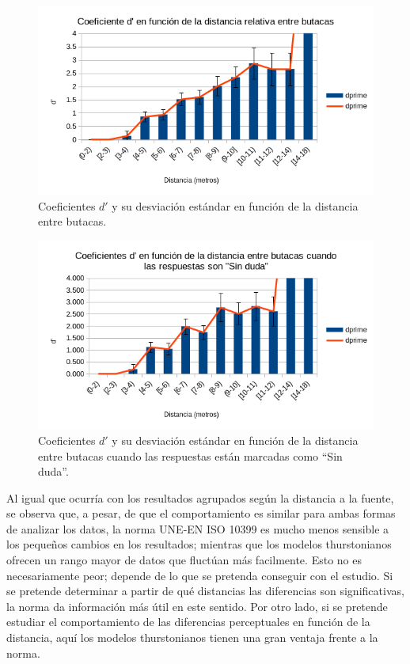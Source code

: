 \documentclass[11pt,a4paper,twoside]{book}
\begin{document}
		    \begin{figure}
                \includegraphics[scale=0.7]{../imagenes/analisisThurstButacasDuda.png}
			    \centering
			    \caption{Coeficientes $d'$ y su desviación estándar en función de la distancia entre butacas.} 
			    \label{fig:ThurstButacasDuda}
            \end{figure}
            
            \begin{figure}
                \includegraphics[scale=0.7]{../imagenes/analisisThurstButacasSinDuda.png}
			    \centering
			    \caption{Coeficientes $d'$ y su desviación estándar en función de la distancia entre butacas cuando las respuestas están marcadas como ``Sin duda''.} 
			    \label{fig:ThurstButacasSinDuda}
            \end{figure}
            
            Al igual que ocurría con los resultados agrupados según la distancia a la fuente, se observa que, a pesar, de que el comportamiento es similar para ambas formas de analizar los datos, la norma UNE-EN ISO 10399\cite{ISO10399} es mucho menos sensible a los pequeños cambios en los resultados; mientras que los modelos thurstonianos ofrecen un rango mayor de datos que fluctúan más facilmente. Esto no es necesariamente peor; depende de lo que se pretenda conseguir con el estudio. Si se pretende determinar a partir de qué distancias las diferencias son significativas, la norma da información más útil en este sentido. Por otro lado, si se pretende estudiar el comportamiento de las diferencias perceptuales en función de la distancia, aquí los modelos thurstonianos tienen una gran ventaja frente a la norma.
		    
		    
   
\end{document}
